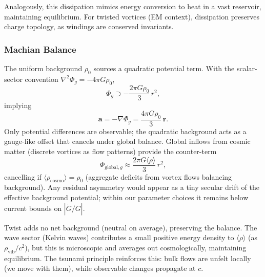 Analogously, this dissipation mimics energy conversion to heat in a vast reservoir, maintaining equilibrium. For twisted vortices (EM context), dissipation preserves charge topology, as windings are conserved invariants.

\subsubsection{Machian Balance}
The uniform background $\rho_0$ sources a quadratic potential term. With the scalar-sector convention $\nabla^2 \Phi_g=-4\pi G\rho_0$,
\begin{equation}
\Phi_g \supset -\frac{2\pi G \rho_0}{3}\,r^2,
\end{equation}
implying
\begin{equation}
\mathbf{a} = -\nabla \Phi_g = \frac{4\pi G \rho_0}{3}\,\mathbf{r}.
\end{equation}
Only potential differences are observable; the quadratic background acts as a gauge-like offset that cancels under global balance. Global inflows from cosmic matter (discrete vortices as flow patterns) provide the counter-term
\begin{equation}
\Phi_{\text{global},g} \approx \frac{2\pi G \langle \rho \rangle}{3}\, r^2,
\end{equation}
cancelling if $\langle \rho_{\text{cosmo}} \rangle = \rho_0$ (aggregate deficits from vortex flows balancing background). Any residual asymmetry would appear as a tiny secular drift of the effective background potential; within our parameter choices it remains below current bounds on $|\dot G/G|$.

Twist adds no net background (neutral on average), preserving the balance. The wave sector (Kelvin waves) contributes a small positive energy density to $\langle \rho \rangle$ (as $\rho_{\text{vib}}/c^2$), but this is microscopic and averages out cosmologically, maintaining equilibrium. The tsunami principle reinforces this: bulk flows are unfelt locally (we move with them), while observable changes propagate at $c$.

\medskip
{}
\medskip

